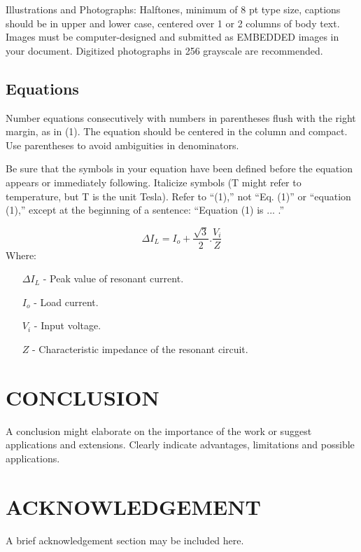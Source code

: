 \documentclass[10pt,twoside,a4paper]{article}
\begin{document}
Illustrations and Photographs: Halftones, minimum of 8 pt type size, captions should be in upper and lower case, centered over 1 or 2 columns of body text. Images must be computer-designed and submitted as EMBEDDED images in your document. Digitized photographs in 256 grayscale are recommended.
\subsection{Equations}

Number equations consecutively with numbers in parentheses flush with the right margin, as in (1). The equation should be centered in the column and compact. Use parentheses to avoid ambiguities in denominators.

Be sure that the symbols in your equation have been defined before the equation appears or immediately following. Italicize symbols (T might refer to temperature, but T is the unit Tesla). Refer to “(1),” not “Eq. (1)” or “equation (1),” except at the beginning of a sentence: “Equation (1) is ... .”

\begin{equation}
\Delta I_{L}=I_{o}+\frac{\sqrt{3}}{2}.\frac{V_{i}}{Z}
\end{equation}
\newline
\newline
Where:

\begin{enumerate}
\item[$\Delta I_{L}$]  - Peak value of resonant current.

\item[$I_{o}$]  - Load current.

\item[$V_{i}$]  - Input voltage.
\newpage 
\item[$Z$]  - Characteristic impedance of the resonant circuit.
\end{enumerate}

\section{CONCLUSION}

A conclusion might elaborate on the importance of the work or suggest applications and extensions. Clearly indicate advantages, limitations and possible applications.

\section*{ACKNOWLEDGEMENT}

A brief acknowledgement section may be included here.

\nocite{refbib1,refbib2,refbib3}


\end{document}

